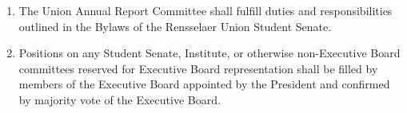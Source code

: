 \documentclass{uniondoc}
\begin{document}
\begin{enumerate}
\begin{enumerate}
\begin{enumerate}
    \end{enumerate}
  \item The purpose of this committee shall be to expedite the budgeting and hiring process of the Board.
  \item The votes and decisions of this committee are to be considered the votes and decisions of the Board.
  \item While in this committee, the Board shall adopt special rules of procedure.
    \begin{enumerate}
    \item The Board will follow procedure as if in a committee.
    \item The chair, if they so desire, may instruct the Parliamentarian to maintain a queue.
    \end{enumerate}
  \item Upon the conclusion of the budgeting session, or by a majority vote of the committee, the committee shall rise, and normal Board procedures shall resume.
  \end{enumerate}
\item The Union Annual Report Committee shall fulfill duties and responsibilities outlined in the Bylaws of the Rensselaer Union Student Senate.
\item Positions on any Student Senate, Institute, or otherwise non-Executive Board committees reserved for Executive Board representation shall be filled by members of the Executive Board appointed by the President and confirmed by majority vote of the Executive Board.
\end{enumerate}
\end{document}
